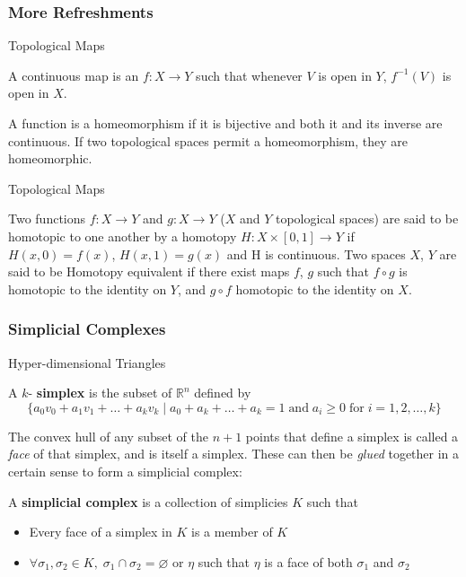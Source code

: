 \documentclass{beamer}
\theoremstyle{definition}
\numberwithin{theorem}{section}
\begin{document}
\begin{frame}
\frametitle{More Refreshments}
\begin{block}{Topological Maps}
\begin{definition}
A continuous map is an $f:X\rightarrow Y$ such that whenever $V$ is open in $Y$, $f^{-1}(V)$ is open in $X$.
\end{definition}
\begin{definition}
A function is a homeomorphism if it is bijective and both it and its inverse are continuous. If two topological spaces permit a homeomorphism, they are homeomorphic.
\end{definition}
\end{block}
\end{frame}
\begin{frame}
\begin{block}{Topological Maps}
\begin{definition}
Two functions $f: X\rightarrow Y$ and $g: X \rightarrow Y$ ($X$ and $Y$ topological spaces) are said to be homotopic to one another by a homotopy $H: X \times [0,1] \rightarrow Y$ if $H(x,0) = f(x)$, $H(x,1) = g(x)$ and H is continuous.\newline
Two spaces $X$, $Y$ are said to be Homotopy equivalent if there exist maps $f$, $g$ such that $f \circ g$ is homotopic to the identity on $Y$, and $g \circ f$ homotopic to the identity on $X$.
\end{definition}



\end{block}
\end{frame}




\begin{frame}
\small
\frametitle{Simplicial Complexes}
\begin{block}{Hyper-dimensional Triangles}
\begin{definition}
A $k$- \textbf{simplex} is the subset of $\mathbb{R}^n$ defined by
\scriptsize
$$\{ a_0v_0+ a_1v_1+ \hdots + a_kv_k \; | \; a_0 + a_k + \hdots + a_k = 1 \; \textrm{and} \; a_i \geq 0 \;\textrm{for} \;i = 1, 2, \hdots, k \}$$
\small

\end{definition}
The convex hull of any subset of the $n+1$ points that define a simplex is called a \textit{face} of that simplex, and is itself a simplex.
These can then be \textit{glued} together in a certain sense to form a simplicial complex:
\begin{definition}
A \textbf{simplicial complex} is a collection of simplicies $K$ such that 
\begin{itemize}
\item{Every face of a simplex in $K$ is a member of $K$}
\item{$\forall \sigma_1, \sigma_2 \in K, \; \sigma_1 \cap \sigma_2 = \varnothing$ or $\eta$ such that $\eta$ is a face of both $\sigma_1$ and $\sigma_2$}
\end{itemize}
\end{definition}
\end{block}
\end{frame}
\end{document}
